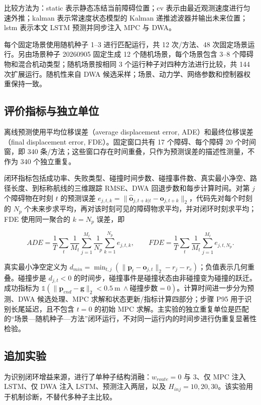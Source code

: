 \documentclass[10pt,a4paper,twocolumn]{ctexart}
\begin{document}
比较方法为：static 表示静态冻结当前障碍位置；cv 表示由最近观测速度进行匀速外推；kalman 表示常速度状态模型的 Kalman 递推滤波器并输出未来位置；lstm 表示本文 LSTM 预测并同步注入 MPC 与 DWA。

每个固定场景使用随机种子 1–3 进行匹配运行，共 12 次/方法、48 次固定场景运行。另由场景种子 20260905 固定生成 12 个随机场景，每个场景包含 3–8 个障碍物和混合机动类型；随机场景按相同 3 个运行种子对四种方法进行比较，共 144 次扩展运行。随机性来自 DWA 候选采样；场景、动力学、网络参数和控制器权重保持一致。

\subsection{评价指标与独立单位}

离线预测使用平均位移误差（average displacement error, ADE）和最终位移误差（final displacement error, FDE）。固定窗口共有 17 个障碍、每个障碍 20 个时间窗，即 340 条/方法；这些窗口存在时间重叠，只作为预测误差的描述性测量，不作为 340 个独立重复。

闭环指标包括成功率、失败类型、碰撞时间步数、碰撞事件数、真实最小净空、路径长度、到标称航线的三维跟踪 RMSE、DWA 回退步数和每步计算时间。对第 $j$ 个障碍物在时刻 $t$ 的预测误差 $e_{j,t,k}=\|\hat{\mathbf o}_{j,t+k|t}-\mathbf o_{j,t+k}\|_2$，代码先对每个时刻的 $N_p$ 个未来步求平均，再对该时刻可见的障碍物求平均，并对闭环时刻求平均；FDE 使用同一聚合的 $k=N_p$ 误差，即

\[
ADE=\frac{1}{T}\sum_t\frac{1}{M_t}\sum_{j=1}^{M_t}\frac{1}{N_p}\sum_{k=1}^{N_p}e_{j,t,k},\qquad
FDE=\frac{1}{T}\sum_t\frac{1}{M_t}\sum_{j=1}^{M_t}e_{j,t,N_p}.
\]

真实最小净空定义为 $d_{min}=\min_{t,j}(\|\mathbf p_t-\mathbf o_{j,t}\|_2-r_j-r_e)$；负值表示几何重叠。碰撞步是 $d_{j,t}<0$ 的时间步，碰撞事件是碰撞状态由非碰撞变为碰撞的跃迁。成功指标为 $\mathbb{1}(\|\mathbf p_{end}-\mathbf g\|_2<0.5\ \mathrm m\ \land\text{碰撞步数}=0)$。计算时间进一步分为预测、DWA 候选处理、MPC 求解和状态更新/指标计算四部分；步骤 P95 用于识别长尾延迟，且不包含 $t=0$ 的初始 MPC 求解。主实验的独立重复单位是匹配的“场景—随机种子—方法”闭环运行，不对同一运行内的时间步进行伪重复显著性检验。

\subsection{追加实验}

为识别闭环增益来源，进行了单种子结构消融：$w_{route}=0$ 与 3、仅 MPC 注入 LSTM、仅 DWA 注入 LSTM、预测注入两层，以及 $H_{inj}=10,20,30$。该实验用于机制诊断，不替代多种子主比较。
\end{document}
